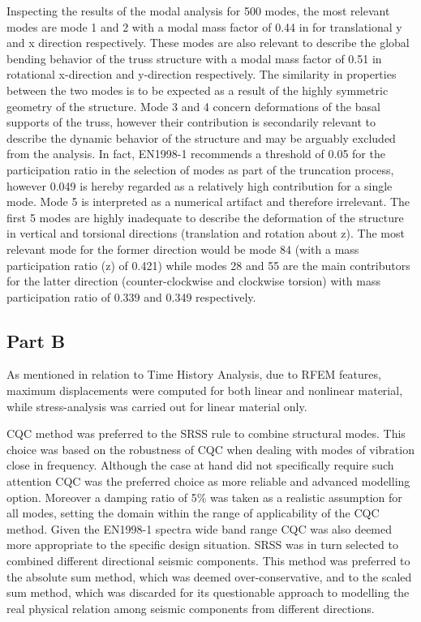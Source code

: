 \documentclass[11pt]{article}
\begin{document}
Inspecting the results of the modal analysis for 500 modes, the most
relevant modes are mode 1 and 2 with a modal mass factor of 0.44 in for
translational y and x direction respectively. These modes are also
relevant to describe the global bending behavior of the truss structure
with a modal mass factor of 0.51 in rotational x-direction and
y-direction respectively. The similarity in properties between the two
modes is to be expected as a result of the highly symmetric geometry of
the structure. Mode 3 and 4 concern deformations of the basal supports
of the truss, however their contribution is secondarily relevant to
describe the dynamic behavior of the structure and may be arguably
excluded from the analysis. In fact, EN1998-1 recommends a threshold of
0.05 for the participation ratio in the selection of modes as part of
the truncation process, however 0.049 is hereby regarded as a relatively
high contribution for a single mode. Mode 5 is interpreted as a
numerical artifact and therefore irrelevant. The first 5 modes are
highly inadequate to describe the deformation of the structure in
vertical and torsional directions (translation and rotation about z).
The most relevant mode for the former direction would be mode 84 (with a
mass participation ratio (z) of 0.421) while modes 28 and 55 are the
main contributors for the latter direction (counter-clockwise and
clockwise torsion) with mass participation ratio of 0.339 and 0.349
respectively.

\subsection{Part B}\label{part-b}

As mentioned in relation to Time History Analysis, due to RFEM features,
maximum displacements were computed for both linear and nonlinear
material, while stress-analysis was carried out for linear material
only.

CQC method was preferred to the SRSS rule to combine structural modes.
This choice was based on the robustness of CQC when dealing with modes
of vibration close in frequency. Although the case at hand did not
specifically require such attention CQC was the preferred choice as more
reliable and advanced modelling option. Moreover a damping ratio of 5\%
was taken as a realistic assumption for all modes, setting the domain
within the range of applicability of the CQC method. Given the EN1998-1
spectra wide band range CQC was also deemed more appropriate to the
specific design situation. SRSS was in turn selected to combined
different directional seismic components. This method was preferred to
the absolute sum method, which was deemed over-conservative, and to the
scaled sum method, which was discarded for its questionable approach to
modelling the real physical relation among seismic components from
different directions.
\end{document}
